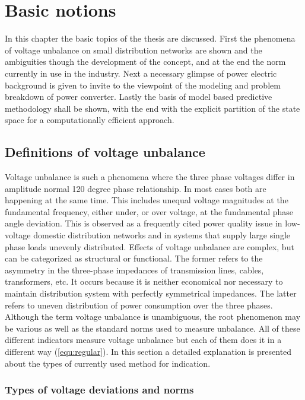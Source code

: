 \chapter{Basic notions}\label{BASIC:sec:main}

In this chapter the basic topics of the thesis are discussed. First the phenomena of voltage unbalance on small distribution networks are shown and the ambiguities though the development of the concept, and at the end the norm currently in use in the industry. Next a necessary glimpse of power electric background is given to invite to the viewpoint of the modeling and problem breakdown of power converter. Lastly the basis of model based predictive methodology shall be shown, with the end with the explicit partition of the state space for a computationally efficient approach.

	\section{Definitions of voltage unbalance}\label{BASICUNB:sec:DefinitionsofUNB}
	
	Voltage unbalance is such a phenomena where the three phase voltages differ in amplitude normal 120 degree phase relationship. In most cases both are happening at the same time. This includes unequal voltage magnitudes at the fundamental frequency, either under, or over voltage, at the fundamental phase angle deviation. This is observed as a frequently cited power quality issue in low-voltage domestic distribution networks and in systems that supply large single phase loads unevenly distributed. Effects of voltage unbalance are complex, but can be categorized as structural or functional. The former refers to the asymmetry in the three-phase impedances of transmission lines, cables, transformers, etc. It occurs because it is neither economical nor necessary to maintain distribution system with perfectly symmetrical impedances. The latter refers to uneven distribution of power consumption over the three phases. Although the term voltage unbalance is unambiguous, the root phenomenon may be various as well as the standard norms used to measure unbalance. All of these different indicators measure voltage unbalance but each of them does it in a different way (\ref{equ:regular}). In this section a detailed explanation is presented about the types of currently used method for indication.
	
	\subsection{Types of voltage deviations and norms}\label{BASICUNB:sec:DefinitionsofUNB}

